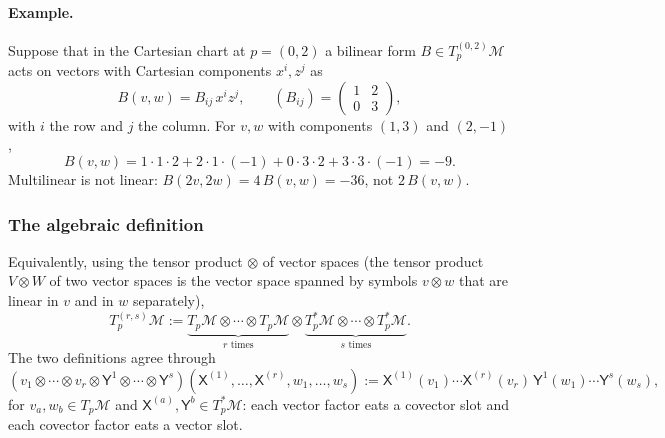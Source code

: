 \documentclass[11pt]{article}
\newcommand{\TpM}{T_p\mathcal M}
\newcommand{\TpsM}{T_p^*\mathcal M}
\newcommand{\TprsM}{T_p^{(r,s)}\mathcal M}
\begin{document}
\paragraph{Example.} Suppose that in the Cartesian chart at $p=(0,2)$ a bilinear form $B\in T_p^{(0,2)}\mathcal M$ acts on vectors with Cartesian components $x^i,z^j$ as
\[
B(v,w)=B_{ij}\,x^iz^j,\qquad(B_{ij})=\begin{pmatrix}1&2\\0&3\end{pmatrix},
\]
with $i$ the row and $j$ the column. For $v,w$ with components $(1,3)$ and $(2,-1)$,
\[
B(v,w)=1\cdot1\cdot2+2\cdot1\cdot(-1)+0\cdot3\cdot2+3\cdot3\cdot(-1)=-9.
\]
Multilinear is not linear: $B(2v,2w)=4\,B(v,w)=-36$, not $2\,B(v,w)$.

\subsubsection*{The algebraic definition}
Equivalently, using the tensor product $\otimes$ of vector spaces (the tensor product $V\otimes W$ of two vector spaces is the vector space spanned by symbols $v\otimes w$ that are linear in $v$ and in $w$ separately),
\[
\TprsM:=\underbrace{\TpM\otimes\cdots\otimes\TpM}_{r\text{ times}}\otimes\underbrace{\TpsM\otimes\cdots\otimes\TpsM}_{s\text{ times}}.
\]
The two definitions agree through
\[
(v_1\otimes\cdots\otimes v_r\otimes\mathsf Y^1\otimes\cdots\otimes\mathsf Y^s)(\mathsf X^{(1)},\dots,\mathsf X^{(r)},w_1,\dots,w_s):=\mathsf X^{(1)}(v_1)\cdots\mathsf X^{(r)}(v_r)\,\mathsf Y^1(w_1)\cdots\mathsf Y^s(w_s),
\]
for $v_a,w_b\in\TpM$ and $\mathsf X^{(a)},\mathsf Y^b\in\TpsM$: each vector factor eats a covector slot and each covector factor eats a vector slot.
\end{document}
